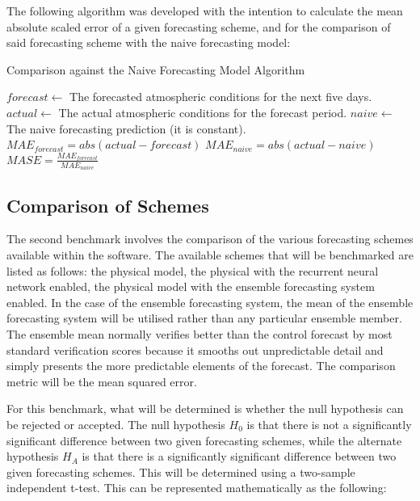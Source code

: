 The following algorithm was developed with the intention to calculate the mean absolute scaled error of a given forecasting scheme, and for the comparison of said forecasting scheme with the naive forecasting model:

\begin{algorithm}[H]
    \caption{Comparison against the Naive Forecasting Model Algorithm}
    \begin{algorithmic}[1]
        \State $ forecast \gets $ The forecasted atmospheric conditions for the next five days. 
        \State $ actual \gets $ The actual atmospheric conditions for the forecast period.
        \State $ naive \gets $ The naive forecasting prediction (it is constant).
            \State $MAE_{forecast} = abs(actual - forecast)$
            \State $MAE_{naive} = abs(actual - naive)$
            \State $MASE = \frac{MAE_{forecast}}{MAE_{naive}}$
        \EndFunction
    \end{algorithmic}
\end{algorithm}

\subsection{Comparison of Schemes}
The second benchmark involves the comparison of the various forecasting schemes available within the software. The available schemes that will be benchmarked are listed as follows: the physical model, the physical with the recurrent neural network enabled, the physical model with the ensemble forecasting system enabled. In the case of the ensemble forecasting system, the mean of the ensemble forecasting system will be utilised rather than any particular ensemble member. The ensemble mean normally verifies better than the control forecast by most standard verification scores because it smooths out unpredictable detail and simply presents the more predictable elements of the forecast\cite{intro_efs}. The comparison metric will be the mean squared error.

For this benchmark, what will be determined is whether the null hypothesis can be rejected or accepted. The null hypothesis $H_0$ is that there is not a significantly significant difference between two given forecasting schemes, while the alternate hypothesis $H_A$ is that there is a significantly significant difference between two given forecasting schemes. This will be determined using a two-sample independent t-test. This can be represented mathematically as the following:

